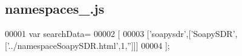\subsection{namespaces\+\_.\+js}
\label{namespaces__0_8js_source}

\begin{DoxyCode}
00001 var searchData=
00002 [
00003   [\textcolor{stringliteral}{'soapysdr'},[\textcolor{stringliteral}{'SoapySDR'},[\textcolor{stringliteral}{'../namespaceSoapySDR.html'},1,\textcolor{stringliteral}{''}]]]
00004 ];
\end{DoxyCode}
